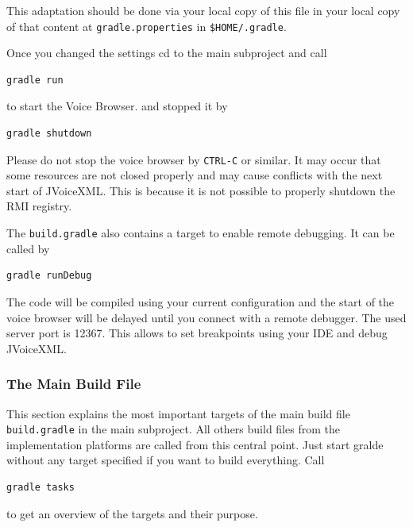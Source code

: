 \documentclass[11pt,a4paper]{article}
\begin{document}
This adaptation should be done via your local copy of this file in your
local copy of that content at \texttt{gradle.properties} in
\texttt{\$HOME/.gradle}.

Once you changed the settings cd to the main subproject and call
\begin{lstlisting}
gradle run
\end{lstlisting}
to start the Voice Browser.
and stopped it by
\begin{lstlisting}
gradle shutdown
\end{lstlisting}

Please do not stop the voice browser by \texttt{CTRL-C} or similar. It may occur
that some resources are not closed properly and may cause conflicts with the next
start of JVoiceXML. This is because it is not possible to properly shutdown the
RMI registry.

The \texttt{build.gradle} also contains a target to enable remote
debugging. It can be called by
\begin{lstlisting}
gradle runDebug
\end{lstlisting}
The code will be compiled using your current configuration and the start of the
voice browser will be delayed until you connect with a remote debugger. The
used server port is 12367. This allows to set breakpoints using your IDE and
debug JVoiceXML.

\subsubsection{The Main Build File}
\label{sec:main-build-file}

This section explains the most important targets of the main build file
\texttt{build.gradle} in the main subproject. All others build files from the
implementation platforms
are called from this central point. Just start gralde without any target specified
if you want to build everything. Call
\begin{lstlisting}
gradle tasks
\end{lstlisting}
to get an overview of the targets and their purpose.
\end{document}

